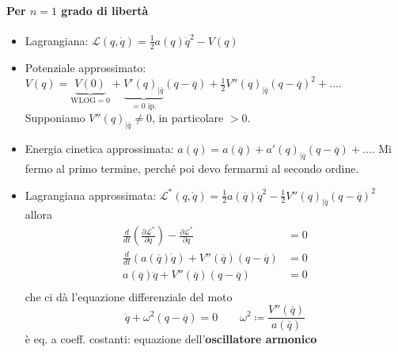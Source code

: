 \documentclass[a4paper,10pt]{article}
\theoremstyle{definition}
\theoremstyle{indentdefinition}
\theoremstyle{indenttheorem}
\theoremstyle{myremark}
\theoremstyle{indentgeneral}
\begin{document}
\paragraph{Per $n=1$ grado di libertà} 
\begin{itemize}
    \item Lagrangiana: $\mathcal{L}(q,\dot{q})=\frac{1}{2}a(q)\dot{q}^2-V(q)$
    \item Potenziale approssimato: $V(q)=\underbrace{V(0)}_{\text{WLOG}=0}+\underbrace{V'(q)_{|\overline{q}}}_{=0 \text{ ip.}}(q-\overline{q})+\frac{1}{2}V''(q)_{|\overline{q}}(q-\overline{q})^2+\dots$. \\
    Supponiamo $V''(q)_{|\overline{q}}\ne0$, in particolare  $>0.$
    \item Energia cinetica approssimata: $a(q)=a(\overline{q})+a'(q)_{|\overline{q}}(q-\overline{q})+\dots$. Mi fermo al primo termine, perché poi devo fermarmi al secondo ordine.
    \item Lagrangiana approssimata: $\mathcal{L}^*(q,\dot{q})=\frac{1}{2}a(\overline{q})\dot{q}^2-\frac{1}{2}V''(q)_{|\overline{q}}(q-\overline{q})^2$ allora 
    \begin{align*}
        \frac{d}{dt}\left(\frac{\partial\mathcal{L}^*}{\partial\dot{q}}\right)- \frac{\partial\mathcal{L}^*}{\partial q}&=0\\
        \frac{d}{dt}(a(\overline{q})\dot{q})+V''(\overline{q})(q-\overline{q})&=0 \\
        a(\overline{q})\ddot{q}+V''(\overline{q})(q-\overline{q})&=0 \\
    \end{align*}
    che ci dà l'equazione differenziale del moto 
    $$ \boxed{\ddot{q}+\omega^2(q-\overline{q})=0} \qquad \omega^2\coloneqq\frac{V''(\overline{q})}{a(\overline{q})}$$
    è eq. a coeff. costanti: equazione dell'\textbf{oscillatore armonico}
\end{itemize}
\end{document}

